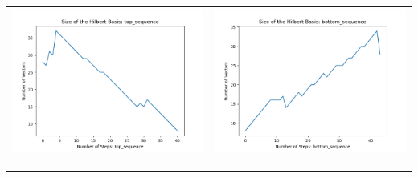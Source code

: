 \documentclass[10pt]{article}
\begin{document}
\begin{tabular}{c|c}
\begin{minipage}{.4\textwidth}
\includegraphics[width=\textwidth]{"DATA/4d/4 generators 2 bound G/top_sequence SIZE"}
\end{minipage} &
\begin{minipage}{.4\textwidth}
\includegraphics[width=\textwidth]{"DATA/4d/4 generators 2 bound G bottomup/bottom_sequence SIZE"}
\end{minipage} \\ \\
\hline \\\begin{minipage}{.4\textwidth}

\end{minipage}
\end{tabular}
\end{document}
